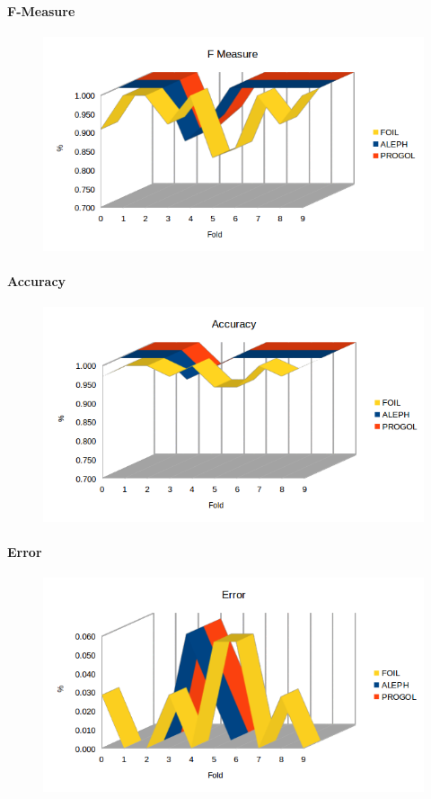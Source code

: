 \paragraph{F-Measure}
\begin{figure}[hbtp]
	\includegraphics[width=1.2\textwidth]{img/datasetGraph/elsevier/fm.png}
	\label{Elsevier-F-measure}
\end{figure}
\paragraph{Accuracy}
\begin{figure}[hbtp]
\includegraphics[width=1.2\textwidth]{img/datasetGraph/elsevier/accuracy.png}
\label{Elsevier-Accuracy}
\end{figure}
\paragraph{Error}
\begin{figure}[hbtp]
	\includegraphics[width=1.2\textwidth]{img/datasetGraph/elsevier/error.png}
	\label{Elsevier-Error}
\end{figure}

